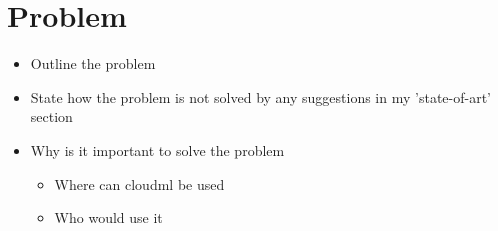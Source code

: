 \section{Problem}

\begin{itemize}
  \item Outline the problem
  \item State how the problem is not solved by any suggestions in my 'state-of-art' section
  \item Why is it important to solve the problem
  \begin{itemize}
    \item Where can cloudml be used
    \item Who would use it
  \end{itemize}
\end{itemize}
